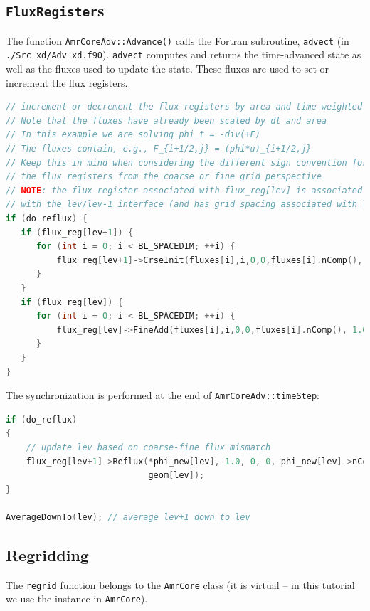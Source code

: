 \subsection{{\tt FluxRegister}s}
The function {\tt AmrCoreAdv::Advance()} calls the Fortran
subroutine, {\tt advect} (in {\tt ./Src\_xd/Adv\_xd.f90}).  {\tt advect} computes
and returns the time-advanced state as well as the fluxes used to update the state.
These fluxes are used to set or increment the flux registers.
\begin{lstlisting}[language=cpp]
// increment or decrement the flux registers by area and time-weighted fluxes
// Note that the fluxes have already been scaled by dt and area
// In this example we are solving phi_t = -div(+F)
// The fluxes contain, e.g., F_{i+1/2,j} = (phi*u)_{i+1/2,j}
// Keep this in mind when considering the different sign convention for updating
// the flux registers from the coarse or fine grid perspective
// NOTE: the flux register associated with flux_reg[lev] is associated
// with the lev/lev-1 interface (and has grid spacing associated with lev-1)
if (do_reflux) { 
   if (flux_reg[lev+1]) {
      for (int i = 0; i < BL_SPACEDIM; ++i) {
          flux_reg[lev+1]->CrseInit(fluxes[i],i,0,0,fluxes[i].nComp(), -1.0);
      }	    
   }
   if (flux_reg[lev]) {
      for (int i = 0; i < BL_SPACEDIM; ++i) {
          flux_reg[lev]->FineAdd(fluxes[i],i,0,0,fluxes[i].nComp(), 1.0);
      }
   }
}
\end{lstlisting}
The synchronization is performed at the end of {\tt AmrCoreAdv::timeStep}:
\begin{lstlisting}[language=cpp]
if (do_reflux)
{
    // update lev based on coarse-fine flux mismatch
    flux_reg[lev+1]->Reflux(*phi_new[lev], 1.0, 0, 0, phi_new[lev]->nComp(),
                            geom[lev]);
}

AverageDownTo(lev); // average lev+1 down to lev
\end{lstlisting}

\subsection{Regridding}
The {\tt regrid} function belongs to the {\tt AmrCore} class (it is virtual -- in this
tutorial we use the instance in {\tt AmrCore}).

